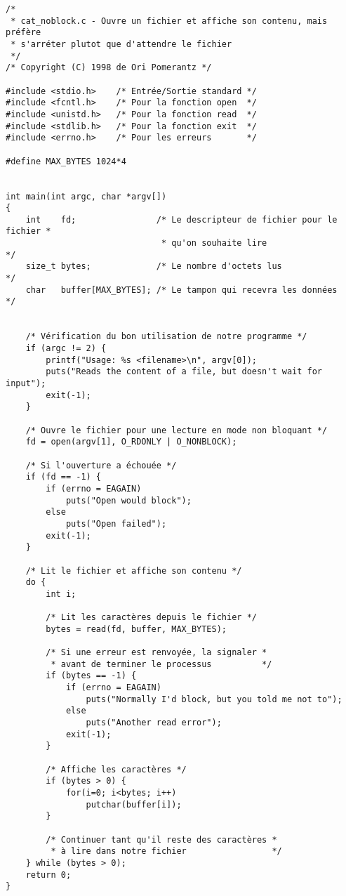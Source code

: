 \documentclass[11pt]{article}
\begin{document}
\begin{verbatim}
/*
 * cat_noblock.c - Ouvre un fichier et affiche son contenu, mais préfère
 * s'arréter plutot que d'attendre le fichier
 */
/* Copyright (C) 1998 de Ori Pomerantz */

#include <stdio.h>    /* Entrée/Sortie standard */
#include <fcntl.h>    /* Pour la fonction open  */
#include <unistd.h>   /* Pour la fonction read  */
#include <stdlib.h>   /* Pour la fonction exit  */
#include <errno.h>    /* Pour les erreurs       */

#define MAX_BYTES 1024*4


int main(int argc, char *argv[])
{
    int    fd;                /* Le descripteur de fichier pour le fichier *
                               * qu'on souhaite lire                       */
    size_t bytes;             /* Le nombre d'octets lus                    */
    char   buffer[MAX_BYTES]; /* Le tampon qui recevra les données         */


    /* Vérification du bon utilisation de notre programme */
    if (argc != 2) {
        printf("Usage: %s <filename>\n", argv[0]);
        puts("Reads the content of a file, but doesn't wait for input");
        exit(-1);
    }

    /* Ouvre le fichier pour une lecture en mode non bloquant */
    fd = open(argv[1], O_RDONLY | O_NONBLOCK);

    /* Si l'ouverture a échouée */
    if (fd == -1) {
        if (errno = EAGAIN)
            puts("Open would block");
        else
            puts("Open failed");
        exit(-1);
    }

    /* Lit le fichier et affiche son contenu */
    do {
        int i;

        /* Lit les caractères depuis le fichier */
        bytes = read(fd, buffer, MAX_BYTES);

        /* Si une erreur est renvoyée, la signaler *
         * avant de terminer le processus          */
        if (bytes == -1) {
            if (errno = EAGAIN)
                puts("Normally I'd block, but you told me not to");
            else
                puts("Another read error");
            exit(-1);
        }

        /* Affiche les caractères */
        if (bytes > 0) {
            for(i=0; i<bytes; i++)
                putchar(buffer[i]);
        }

        /* Continuer tant qu'il reste des caractères *
         * à lire dans notre fichier                 */
    } while (bytes > 0);
    return 0;
}
\end{verbatim}
\end{document}
